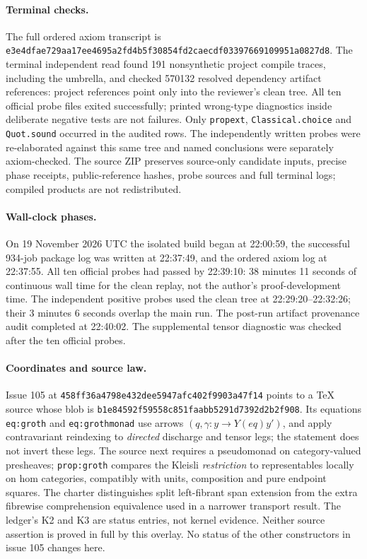\documentclass[11pt]{article}
\begin{document}
\paragraph{Terminal checks.} The full ordered axiom transcript is
\nolinkurl{e3e4dfae729aa17ee4695a2fd4b5f30854fd2caecdf03397669109951a0827d8}. The terminal independent read found 191 nonsynthetic project
compile traces, including the umbrella, and checked 570132 resolved dependency
artifact references: project references point only into the reviewer's clean
tree. All ten official probe files exited successfully; printed wrong-type
diagnostics inside deliberate negative tests are not failures. Only
\texttt{propext}, \texttt{Classical.choice} and \texttt{Quot.sound}
occurred in the audited rows. The independently written probes were
re-elaborated against this same tree and named conclusions were separately
axiom-checked. The source ZIP preserves source-only candidate inputs, precise
phase receipts, public-reference hashes, probe sources and full terminal logs;
compiled products are not redistributed.
\paragraph{Wall-clock phases.} On 19 November 2026 UTC the isolated build began at 22:00:59, the successful 934-job package log was written at 22:37:49, and the ordered axiom log at 22:37:55. All ten official probes had passed by 22:39:10: 38 minutes 11 seconds of continuous wall time for the clean replay, not the author's proof-development time. The independent positive probes used the clean tree at 22:29:20--22:32:26; their 3 minutes 6 seconds overlap the main run. The post-run artifact provenance audit completed at 22:40:02. The supplemental tensor diagnostic was checked after the ten official probes.
\paragraph{Coordinates and source law.}
Issue 105 at \nolinkurl{458ff36a4798e432dee5947afc402f9903a47f14} points to a TeX source whose blob is
\nolinkurl{b1e84592f59558c851faabb5291d7392d2b2f908}.
Its equations \texttt{eq:groth} and \texttt{eq:grothmonad} use arrows
$(q,\gamma:y\to Y(e q)y')$, and apply contravariant reindexing to
\emph{directed} discharge and tensor legs; the statement does not invert
these legs. The source next requires a pseudomonad on category-valued
presheaves; \texttt{prop:groth} compares the Kleisli \emph{restriction}
to representables locally on hom categories, compatibly with units,
composition and pure endpoint squares. The charter distinguishes split
left-fibrant span extension from the extra fibrewise comprehension
equivalence used in a narrower transport result. The ledger's K2 and K3 are
status entries, not kernel evidence. Neither source assertion is proved
in full by this overlay. No status of the other constructors in issue 105
changes here.
\end{document}
